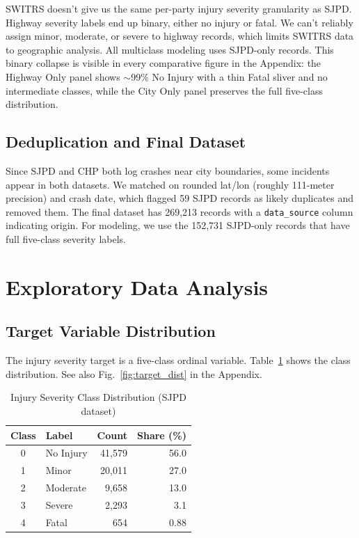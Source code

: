 \documentclass[conference]{IEEEtran}
\begin{document}
SWITRS doesn't give us the same per-party injury severity granularity as SJPD. Highway severity labels end up binary, either no injury or fatal. We can't reliably assign minor, moderate, or severe to highway records, which limits SWITRS data to geographic analysis. All multiclass modeling uses SJPD-only records. This binary collapse is visible in every comparative figure in the Appendix: the Highway Only panel shows $\sim$99\% No Injury with a thin Fatal sliver and no intermediate classes, while the City Only panel preserves the full five-class distribution.

\subsection{Deduplication and Final Dataset}

Since SJPD and CHP both log crashes near city boundaries, some incidents appear in both datasets. We matched on rounded lat/lon (roughly 111-meter precision) and crash date, which flagged 59 SJPD records as likely duplicates and removed them. The final dataset has 269,213 records with a \texttt{data\_source} column indicating origin. For modeling, we use the 152,731 SJPD-only records that have full five-class severity labels.

\section{Exploratory Data Analysis}

\subsection{Target Variable Distribution}

The injury severity target is a five-class ordinal variable. Table~\ref{tab:severity} shows the class distribution. See also Fig.~\ref{fig:target_dist} in the Appendix.

\begin{table}[H]
  \centering
  \caption{Injury Severity Class Distribution (SJPD dataset)}
  \label{tab:severity}
  \begin{tabular}{@{}clrr@{}}
    \toprule
    Class & Label & Count & Share (\%) \\
    \midrule
    0 & No Injury & 41,579 & 56.0 \\
    1 & Minor & 20,011 & 27.0 \\
    2 & Moderate & 9,658 & 13.0 \\
    3 & Severe & 2,293 & 3.1 \\
    4 & Fatal & 654 & 0.88 \\
    \bottomrule
  \end{tabular}
\end{table}
\end{document}
